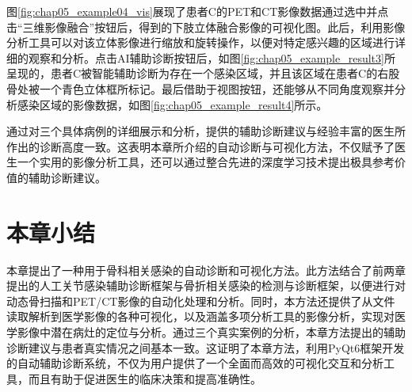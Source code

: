 图\ref{fig:chap05_example04_vis}展现了患者C的PET和CT影像数据通过选中并点击“三维影像融合”按钮后，得到的下肢立体融合影像的可视化图。此后，利用影像分析工具可以对该立体影像进行缩放和旋转操作，以便对特定感兴趣的区域进行详细的观察和分析。点击AI辅助诊断按钮后，如图\ref{fig:chap05_example_result3}所呈现的，患者C被智能辅助诊断为存在一个感染区域，并且该区域在患者C的右股骨处被一个青色立体框所标记。最后借助于视图按钮，还能够从不同角度观察并分析感染区域的影像数据，如图\ref{fig:chap05_example_result4}所示。

通过对三个具体病例的详细展示和分析，提供的辅助诊断建议与经验丰富的医生所作出的诊断高度一致。这表明本章所介绍的自动诊断与可视化方法，不仅赋予了医生一个实用的影像分析工具，还可以通过整合先进的深度学习技术提出极具参考价值的辅助诊断建议。

\section{本章小结}

本章提出了一种用于骨科相关感染的自动诊断和可视化方法。此方法结合了前两章提出的人工关节感染辅助诊断框架与骨折相关感染的检测与诊断框架，以便进行对动态骨扫描和PET/CT影像的自动化处理和分析。同时，本方法还提供了从文件读取解析到医学影像的各种可视化，以及涵盖多项分析工具的影像分析，实现对医学影像中潜在病灶的定位与分析。通过三个真实案例的分析，本章方法提出的辅助诊断建议与患者真实情况之间基本一致。这证明了本章方法，利用PyQt6框架开发的自动辅助诊断系统，不仅为用户提供了一个全面而高效的可视化交互和分析工具，而且有助于促进医生的临床决策和提高准确性。